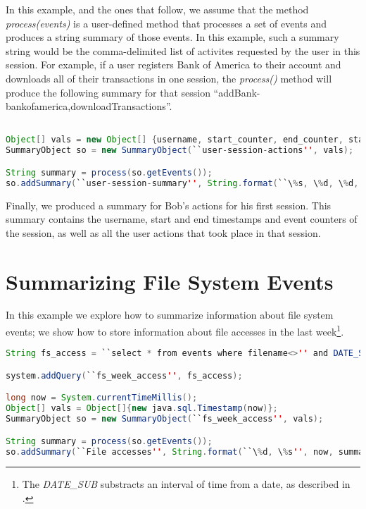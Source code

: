 In this example, and the ones that follow, we assume that the method \emph{process(events)} is a user-defined method that  processes a set of events and produces a string summary of those events. In this example, such a summary string would be the comma-delimited list of activites requested by the user in this session. For example, if a user registers Bank of America to their account and downloads all of their transactions in one session, the \emph{process()} method will produce the following summary for that session ``addBank-bankofamerica,downloadTransactions''.

\begin{lstlisting}[language=Java]

Object[] vals = new Object[] {username, start_counter, end_counter, start_time, end_time};
SummaryObject so = new SummaryObject(``user-session-actions'', vals);

String summary = process(so.getEvents());
so.addSummary(``user-session-summary'', String.format(``\%s, \%d, \%d, \%s, \%s'', username, start_counter, end_counter, start_time, end_time, summary));

\end{lstlisting}

\noindent
Finally, we produced a summary for Bob's actions for his first session. This summary contains the username, start and end timestamps and event counters of the session, as well as all the user actions that took place in that session.

\section{Summarizing File System Events}
\label{sum:fs}
In this example we explore how to summarize information about file system events; we show how to store information about file accesses in the last week\footnote{The \emph{DATE\_SUB} substracts an interval of time from a date, as described in \cite{pgsql-gen}.}.

\begin{lstlisting}[language=Java]
String fs_access = ``select * from events where filename<>'' and DATE_SUB(?, INTERVAL 7 DAY)'';

system.addQuery(``fs_week_access'', fs_access);

long now = System.currentTimeMillis();
Object[] vals = Object[]{new java.sql.Timestamp(now)};
SummaryObject so = new SummaryObject(``fs_week_access'', vals);

String summary = process(so.getEvents());
so.addSummary(``File accesses'', String.format(``\%d, \%s'', now, summary));
\end{lstlisting}

